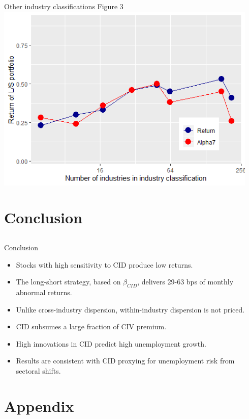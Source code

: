 \documentclass{beamer}
\begin{document}
\begin{frame}{Other industry classifications}
{Figure 3}
\includegraphics[width=0.94\textwidth]{Figure3_sl.png}
\end{frame}



\section{Conclusion}
\subsection{}


\normalsize
\begin{frame}{Conclusion}
\begin{itemize}
    \item {Stocks with high sensitivity to CID produce low returns.}
    \item {The long-short strategy, based on $\beta_{CID}$, delivers 29-63 bps of monthly abnormal returns.}
    \item {Unlike cross-industry dispersion, within-industry dispersion is not priced.}
    \item {CID subsumes a large fraction of CIV premium.}
    \item {High innovations in CID predict high unemployment growth.}
    \item {Results are consistent with CID proxying for unemployment risk from sectoral shifts.}
\end{itemize}
\end{frame}


\section{Appendix}
\end{document}

